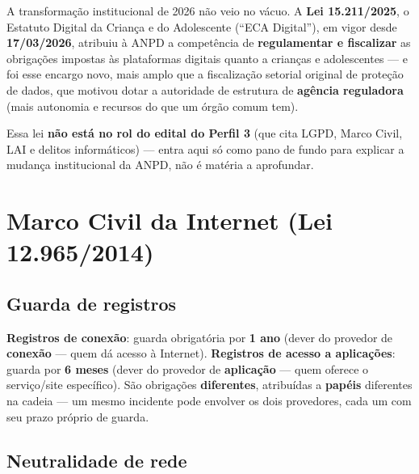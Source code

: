 \begin{conceito}
A transformação institucional de 2026 não veio no vácuo. A \textbf{Lei
15.211/2025}, o Estatuto Digital da Criança e do Adolescente (``ECA
Digital''), em vigor desde \textbf{17/03/2026}, atribuiu à ANPD a
competência de \textbf{regulamentar e fiscalizar} as obrigações impostas
às plataformas digitais quanto a crianças e adolescentes --- e foi esse
encargo novo, mais amplo que a fiscalização setorial original de proteção
de dados, que motivou dotar a autoridade de estrutura de \textbf{agência
reguladora} (mais autonomia e recursos do que um órgão comum tem).

Essa lei \textbf{não está no rol do edital do Perfil 3} (que cita LGPD,
Marco Civil, LAI e delitos informáticos) --- entra aqui só como pano de
fundo para explicar a mudança institucional da ANPD, não é matéria a
aprofundar.
\end{conceito}

\section{Marco Civil da Internet (Lei 12.965/2014)}
\label{sec:marco-civil-teoria}

\subsection{Guarda de registros}

\begin{conceito}
\textbf{Registros de conexão}: guarda obrigatória por \textbf{1 ano} (dever
do provedor de \textbf{conexão} --- quem dá acesso à Internet).
\textbf{Registros de acesso a aplicações}: guarda por \textbf{6 meses}
(dever do provedor de \textbf{aplicação} --- quem oferece o serviço/site
específico). São obrigações \textbf{diferentes}, atribuídas a
\textbf{papéis} diferentes na cadeia --- um mesmo incidente pode envolver
os dois provedores, cada um com seu prazo próprio de guarda.
\end{conceito}

\subsection{Neutralidade de rede}

